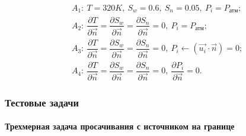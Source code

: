\begin{frame}
\begin{center}
\begin{figure}
\begin{minipage}[h]{0.24\textwidth}
\end{minipage}
\hfill
\begin{minipage}[h]{0.75\textwidth}
 \begin{equation*}
  \begin{aligned}
    &A_1:\ T=320K,\ S_w=0.6,\ S_n=0.05,\ P_i=P_{\text{атм}};\\
    &A_2:\ \dfrac{\partial{T}}{\partial{\overrightarrow{n}}}=\dfrac{\partial{S_w}}{\partial{\overrightarrow{n}}}=\dfrac{\partial{S_n}}{\partial{\overrightarrow{n}}}=0,\ {P_i}=P_{\text{атм}};\\
    &A_3:\ \dfrac{\partial{T}}{\partial{\overrightarrow{n}}}=\dfrac{\partial{S_w}}{\partial{\overrightarrow{n}}}=\dfrac{\partial{S_n}}{\partial{\overrightarrow{n}}}=0,\ P_i\leftarrow(\overrightarrow{u_i} \cdot \overrightarrow{n})=0;\\
    &A_4:\ \dfrac{\partial{T}}{\partial{\overrightarrow{n}}}=\dfrac{\partial{S_w}}{\partial{\overrightarrow{n}}}=\dfrac{\partial{S_n}}{\partial{\overrightarrow{n}}}=0,\ \dfrac{\partial{P_i}}{\partial{\overrightarrow{n}}}=0.
  \end{aligned}
 \end{equation*}
\end{minipage}
\end{figure}
\end{center}
\end{frame}


\begin{frame}
\frametitle{Тестовые задачи}
\framesubtitle{Трехмерная задача просачивания с источником на границе}
\begin{center}
\begin{figure}
\end{figure}
  \end{center}
\end{frame}

